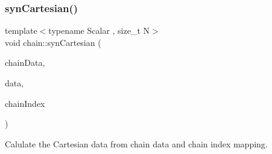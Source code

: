 \subsubsection{\texorpdfstring{syn\+Cartesian()}{synCartesian()}}
{\footnotesize\ttfamily template$<$typename Scalar , size\+\_\+t N$>$ \\
void chain\+::syn\+Cartesian (\begin{DoxyParamCaption}\item[{\mbox{\hyperlink{namespacechain_aa715d2f046187ea9f0c3ea55605d6214}{Vector\+Array}}$<$ Scalar, N $>$ \&}]{chain\+Data,  }\item[{\mbox{\hyperlink{namespacechain_aa715d2f046187ea9f0c3ea55605d6214}{Vector\+Array}}$<$ Scalar, N $>$ \&}]{data,  }\item[{\mbox{\hyperlink{namespacechain_aa40d2da395c0ac2bc5f37832442ac403}{Index\+Array}}$<$ N $>$ \&}]{chain\+Index }\end{DoxyParamCaption})}



Calulate the Cartesian data from chain data and chain index mapping. 


